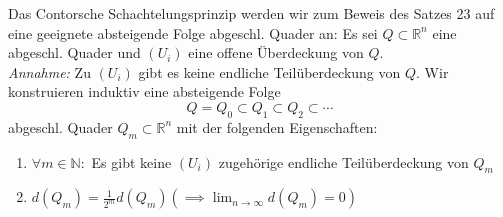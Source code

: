 Das Contorsche Schachtelungsprinzip werden wir zum Beweis des Satzes 23 auf eine geeignete absteigende
Folge abgeschl. Quader an: 
Es sei $ Q \subset \mathbb{R}^n  $ eine abgeschl. Quader und $ \left( U_{i} \right)  $ eine offene
Überdeckung von $ Q $. \\
\textit{Annahme: } Zu  $ \left( U_{i} \right)  $ gibt es keine endliche Teilüberdeckung von $ Q $. 
Wir konstruieren induktiv eine absteigende Folge $$ Q = Q_0 \subset Q_1 \subset Q_2 \subset \cdots $$ 
abgeschl. Quader $ Q_{m} \subset \mathbb{R}^n  $ mit der folgenden Eigenschaften:
\begin{enumerate}[label=\alph*)]
	\item $ \forall m \in  \mathbb{N} :  $ Es gibt keine $ \left( U_{i} \right)  $ zugehörige
		endliche Teilüberdeckung von $ Q_{m} $ 
	\item $ d \left( Q_{m} \right)  = \frac{1}{2^{m}} d \left( Q_{m} \right) \left( \implies 
		\lim_{n \to \infty} d \left( Q_{m} \right) = 0 \right) $ 
\end{enumerate}
	 
\begin{center}
	
\end{center}
